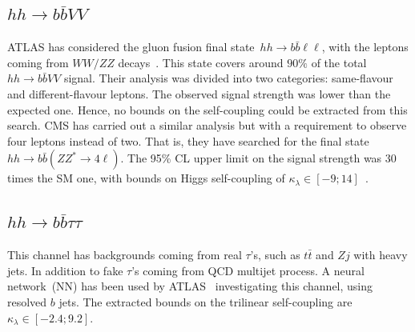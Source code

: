 \subsection*{$hh \to b\bar b VV $}
\par ATLAS has considered the gluon fusion final state~$hh \to b\bar b \ell \ell$, with the leptons coming from $WW/ZZ$ decays~\cite{ATLAS:2019vwv}. This state covers around $90\%$ of the total~$hh \to b\bar b VV $ signal. Their analysis was divided into two categories: same-flavour and different-flavour leptons. The observed signal strength was lower than the expected one. Hence, no bounds on the self-coupling could be extracted from this search. CMS has carried out a similar analysis but with a requirement to observe four leptons instead of two. That is, they have searched for the final state $hh \to b\bar b( ZZ^*\to 4\ell)$. The 95\% CL upper limit on the signal strength was 30 times the SM one, with bounds on Higgs self-coupling of $\kappa_\lambda \in [-9;14]$~\cite{CMS-PAS-HIG-20-004}. 
\subsection*{$hh \to b\bar b \tau \tau $}
\par This channel has backgrounds coming from real $\tau$'s, such as $t\bar t$ and $Z j$ with heavy jets. In addition to fake $\tau$'s coming from QCD multijet process. A neural network~(NN) has been used by ATLAS~\cite{ATLAS-CONF-2021-052} investigating this channel, using resolved $b$ jets. The extracted bounds on the trilinear self-coupling are $\kappa_\lambda \in [-2.4;9.2]$. 
